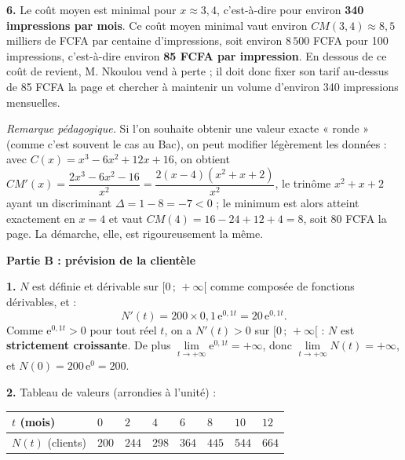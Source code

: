 \documentclass[11pt]{article}
\begin{document}
\begin{exoresolu}
\textbf{6.} Le coût moyen est minimal pour $x \approx 3{,}4$, c'est-à-dire pour environ \textbf{340 impressions par mois}. Ce coût moyen minimal vaut environ $CM(3{,}4) \approx 8{,}5$ milliers de FCFA par centaine d'impressions, soit environ $8\,500$ FCFA pour 100 impressions, c'est-à-dire environ \textbf{85 FCFA par impression}. En dessous de ce coût de revient, M. Nkoulou vend à perte ; il doit donc fixer son tarif au-dessus de 85 FCFA la page et chercher à maintenir un volume d'environ 340 impressions mensuelles.

\medskip
\emph{Remarque pédagogique.} Si l'on souhaite obtenir une valeur exacte « ronde » (comme c'est souvent le cas au Bac), on peut modifier légèrement les données : avec $C(x) = x^3 - 6x^2 + 12x + 16$, on obtient $CM'(x) = \dfrac{2x^3 - 6x^2 - 16}{x^2} = \dfrac{2(x-4)(x^2+x+2)}{x^2}$, le trinôme $x^2+x+2$ ayant un discriminant $\Delta = 1 - 8 = -7 < 0$ ; le minimum est alors atteint exactement en $x = 4$ et vaut $CM(4) = 16 - 24 + 12 + 4 = 8$, soit 80 FCFA la page. La démarche, elle, est rigoureusement la même.

\textbf{Partie B : prévision de la clientèle}

\textbf{1.} $N$ est définie et dérivable sur $[0\,;\,+\infty[$ comme composée de fonctions dérivables, et :
\[ N'(t) = 200 \times 0{,}1\,\mathrm{e}^{0{,}1t} = 20\,\mathrm{e}^{0{,}1t}. \]
Comme $\mathrm{e}^{0{,}1t} > 0$ pour tout réel $t$, on a $N'(t) > 0$ sur $[0\,;\,+\infty[$ : $N$ est \textbf{strictement croissante}. De plus $\lim\limits_{t \to +\infty} \mathrm{e}^{0{,}1t} = +\infty$, donc $\lim\limits_{t \to +\infty} N(t) = +\infty$, et $N(0) = 200\,\mathrm{e}^{0} = 200$.

\textbf{2.} Tableau de valeurs (arrondies à l'unité) :

\begin{center}
\begin{tabularx}{\linewidth}{|l|*{7}{X|}}
\hline
\rowcolor{popblueL}
$t$ (mois) & $0$ & $2$ & $4$ & $6$ & $8$ & $10$ & $12$ \\
\hline
$N(t)$ (clients) & $200$ & $244$ & $298$ & $364$ & $445$ & $544$ & $664$ \\
\hline
\end{tabularx}
\end{center}


\end{exoresolu}
\end{document}
